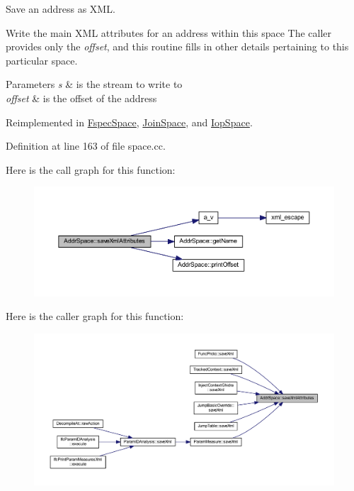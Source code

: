 Save an address as X\+ML. 

Write the main X\+ML attributes for an address within this space The caller provides only the {\itshape offset}, and this routine fills in other details pertaining to this particular space. 
\begin{DoxyParams}{Parameters}
{\em s} & is the stream to write to \\
\hline
{\em offset} & is the offset of the address \\
\hline
\end{DoxyParams}


Reimplemented in \mbox{\hyperlink{class_fspec_space_ad68a1bf048371fd9e5b4acb2b4bbf36c}{Fspec\+Space}}, \mbox{\hyperlink{class_join_space_a1468359068efe2f1d3fe0c30a4d5ff00}{Join\+Space}}, and \mbox{\hyperlink{class_iop_space_a74fe87f16204159a66ea95cc0d9b3355}{Iop\+Space}}.



Definition at line 163 of file space.\+cc.

Here is the call graph for this function\+:
\nopagebreak
\begin{figure}[H]
\begin{center}
\leavevmode
\includegraphics[width=350pt]{class_addr_space_a4475d64c56141adf80cb0aca5b23e3c6_cgraph}
\end{center}
\end{figure}
Here is the caller graph for this function\+:
\nopagebreak
\begin{figure}[H]
\begin{center}
\leavevmode
\includegraphics[width=350pt]{class_addr_space_a4475d64c56141adf80cb0aca5b23e3c6_icgraph}
\end{center}
\end{figure}
\mbox{\label{class_addr_space_a67510a8345fcc17157cc0389e757d504}} 
